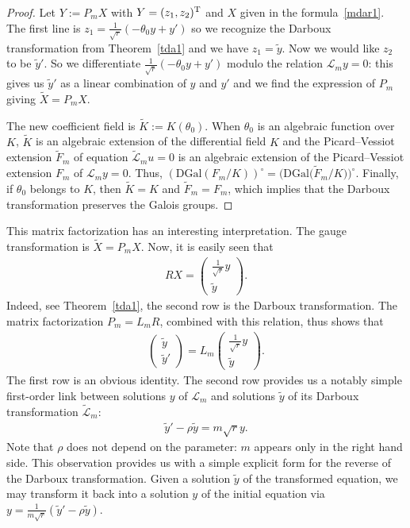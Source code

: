 \documentclass[10pt,a4paper]{amsart}
\numberwithin{equation}{section}
\begin{document}
\begin{proof}
Let $Y:=P_m X$ with $Y=(z_1,z_2)^{\rm T}$ and $X$ given in the formula~\eqref{mdar1}. The first line is
$z_1=\frac{1}{\sqrt{r}}(-\theta_0 y + y')$ so we recognize the Darboux transformation from Theorem~\ref{tda1} and we have $z_1=\tilde{y}$. Now we would like $z_2$ to be $\tilde{y}'$.
So we differentiate $\frac{1}{\sqrt{r}}(-\theta_0 y + y')$ modulo the relation ${\mathcal{L}}_my=0$: this gives us $\tilde{y}'$ as a linear combination of $y$ and $y'$ and we find the expression of $P_m$
giving $\tilde{X}=P_m X$.

The new coefficient field is $\widetilde{K}:=K(\theta_0)$.
When $\theta_0$ is an algebraic function over $K$,
$\widetilde{K}$ is an algebraic extension of the differential field $K$ and the Picard--Vessiot extension $\widetilde{F}_m$ of equation $\widetilde{\mathcal L}_m u=0$ is an algebraic extension of the Picard--Vessiot extension $F_m$ of ${\mathcal{L}}_my=0$.
Thus, $(\mathrm{DGal}(F_m/K))^\circ =\big(\mathrm{DGal}\big(\widetilde F_m/K\big)\big)^\circ$.
Finally, if $\theta_0$ belongs to $K$, then $\widetilde K=K$ and $\widetilde{F}_m=F_m$, which implies that the Darboux transformation preserves the Galois groups.
\end{proof}

\begin{Remark}
This matrix factorization has an interesting interpretation. The gauge transformation is $\widetilde{X} = P_m X$.
Now, it is easily seen that
\begin{gather*}
R X = \begin{pmatrix} \frac{1}{\sqrt{r}}y \\ \tilde{y} \end{pmatrix}\!.
\end{gather*}
Indeed, see Theorem~\ref{tda1}, the second row is the Darboux transformation. The matrix factorization $P_m=L_m R$, combined with this relation, thus shows
that
\begin{gather*}
\begin{pmatrix} \tilde{y} \\ \tilde{y}' \end{pmatrix} = L_m \begin{pmatrix} \frac{1}{\sqrt{r}}y \\ \tilde{y} \end{pmatrix}\!.
\end{gather*}
The first row is an obvious identity.
The second row provides us a notably simple first-order link between solutions $y$ of $\mathcal{L}_m$ and solutions $\tilde{y}$ of its Darboux transformation $\widetilde{\mathcal{L}}_m$:
\begin{gather*}
\tilde{y}' - \rho \tilde{y} = m \sqrt{r} y.
\end{gather*}
Note that $\rho$ does not depend on the parameter: $m$ appears only in the right hand side.
This observation provides us with a simple explicit form for the reverse of the Darboux transformation. Given a solution $\tilde{y}$ of the transformed equation, we may transform it back into a solution $y$ of the initial equation via $y = \frac1{m \sqrt{r}}(\tilde{y}' - \rho \tilde{y})$.
\end{Remark}
\end{document}
